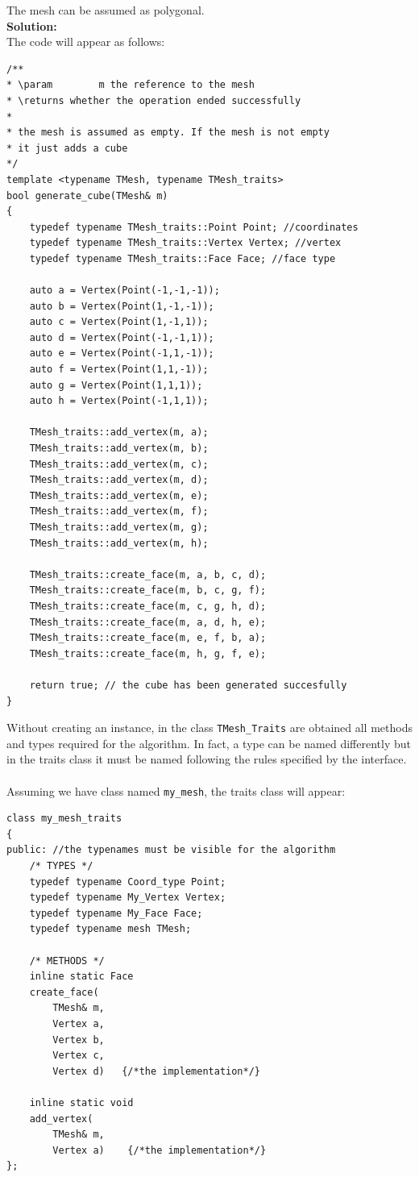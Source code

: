 The mesh can be assumed as polygonal.\\

\textbf{Solution:}\\
The code will appear as follows:


\begin{lstlisting}
/**
* \param		m the reference to the mesh
* \returns whether the operation ended successfully
*
* the mesh is assumed as empty. If the mesh is not empty
* it just adds a cube
*/
template <typename TMesh, typename TMesh_traits>
bool generate_cube(TMesh& m)
{
	typedef typename TMesh_traits::Point Point; //coordinates
	typedef typename TMesh_traits::Vertex Vertex; //vertex
	typedef typename TMesh_traits::Face Face; //face type
	
	auto a = Vertex(Point(-1,-1,-1));
	auto b = Vertex(Point(1,-1,-1));
	auto c = Vertex(Point(1,-1,1));
	auto d = Vertex(Point(-1,-1,1));
	auto e = Vertex(Point(-1,1,-1));
	auto f = Vertex(Point(1,1,-1));
	auto g = Vertex(Point(1,1,1));
	auto h = Vertex(Point(-1,1,1));
	
	TMesh_traits::add_vertex(m, a);
	TMesh_traits::add_vertex(m, b);
	TMesh_traits::add_vertex(m, c);
	TMesh_traits::add_vertex(m, d);
	TMesh_traits::add_vertex(m, e);
	TMesh_traits::add_vertex(m, f);
	TMesh_traits::add_vertex(m, g);
	TMesh_traits::add_vertex(m, h);

	TMesh_traits::create_face(m, a, b, c, d);
	TMesh_traits::create_face(m, b, c, g, f);
	TMesh_traits::create_face(m, c, g, h, d);
	TMesh_traits::create_face(m, a, d, h, e);		
	TMesh_traits::create_face(m, e, f, b, a);		
	TMesh_traits::create_face(m, h, g, f, e);
	
	return true; // the cube has been generated succesfully
}
\end{lstlisting}
\label{code:traits}

Without creating an instance, in the class \texttt{TMesh\_Traits} are obtained all
methods and types required for the algorithm. In fact, a type can be named
differently but in the traits class it must be named following the rules specified
by the interface.\\
\\
Assuming we have class named \texttt{my\_mesh}, the traits class will appear:
\begin{lstlisting}
class my_mesh_traits
{
public:	//the typenames must be visible for the algorithm
	/* TYPES */
	typedef typename Coord_type Point;
	typedef typename My_Vertex Vertex;
	typedef typename My_Face Face;
	typedef typename mesh TMesh;

	/* METHODS */
	inline static Face
	create_face(
		TMesh& m,
		Vertex a,
		Vertex b,
		Vertex c,
		Vertex d)	{/*the implementation*/}
	
	inline static void
	add_vertex(
		TMesh& m,
		Vertex a)	 {/*the implementation*/}
};
\end{lstlisting}